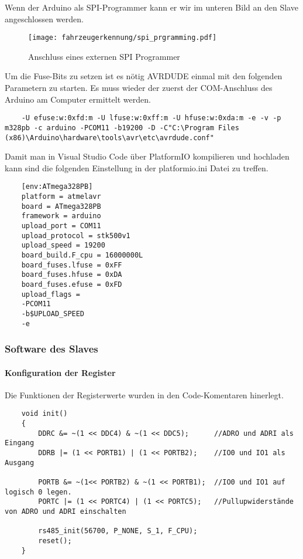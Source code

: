 Wenn der Arduino als SPI-Programmer kann er wir im unteren Bild an den Slave angeschlossen werden.

\begin{figure}[H]
    \centering
    \texttt{[image: fahrzeugerkennung/spi\_prgramming.pdf]}
    \caption{Anschluss eines externen SPI Programmer}
\end{figure}

Um die Fuse-Bits zu setzen ist es nötig AVRDUDE einmal mit den folgenden Parametern zu starten. Es muss wieder der zuerst der COM-Anschluss des Arduino am Computer ermittelt werden.

\begin{listing}[H]
    \begin{verbatim}
    -U efuse:w:0xfd:m -U lfuse:w:0xff:m -U hfuse:w:0xda:m -e -v -p m328pb -c arduino -PCOM11 -b19200 -D -C"C:\Program Files (x86)\Arduino\hardware\tools\avr\etc\avrdude.conf"
    \end{verbatim}
    \caption{AVRDUDE Argumente für die Fuse-Bits}
\end{listing}

Damit man  in Visual Studio Code über PlatformIO kompilieren und hochladen kann sind die folgenden Einstellung in der platformio.ini Datei zu treffen.


\begin{listing}[H]
    \begin{verbatim}
    [env:ATmega328PB]
    platform = atmelavr
    board = ATmega328PB
    framework = arduino
    upload_port = COM11
    upload_protocol = stk500v1
    upload_speed = 19200
    board_build.F_cpu = 16000000L
    board_fuses.lfuse = 0xFF
    board_fuses.hfuse = 0xDA
    board_fuses.efuse = 0xFD
    upload_flags = 
    -PCOM11
    -b$UPLOAD_SPEED
    -e
    \end{verbatim}
    \caption{PlatformIO Einstellungen}
\end{listing}
\subsubsection{Software des Slaves}
\paragraph{Konfiguration der Register}\mbox{} 

Die Funktionen der Registerwerte wurden in den Code-Komentaren hinerlegt.
\begin{listing}[H]
    \begin{verbatim}
    void init()
    {
        DDRC &= ~(1 << DDC4) & ~(1 << DDC5);      //ADRO und ADRI als Eingang 
        DDRB |= (1 << PORTB1) | (1 << PORTB2);    //IO0 und IO1 als Ausgang
    
        PORTB &= ~(1<< PORTB2) & ~(1 << PORTB1);  //IO0 und IO1 auf logisch 0 legen.
        PORTC |= (1 << PORTC4) | (1 << PORTC5);   //Pullupwiderstände von ADRO und ADRI einschalten
        
        rs485_init(56700, P_NONE, S_1, F_CPU);
        reset();
    }
    \end{verbatim}
    \caption{allgemeine Registereinstellungen}
\end{listing}

